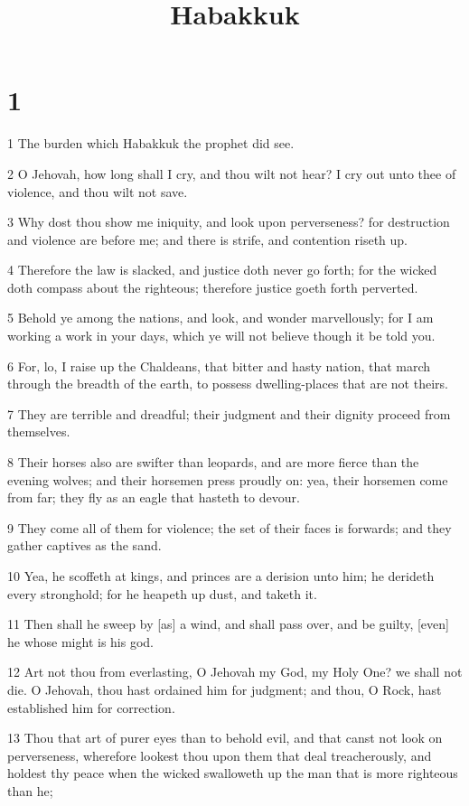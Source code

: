 

\title{Habakkuk}

\chapter{1}

\par 1 The burden which Habakkuk the prophet did see.
\par 2 O Jehovah, how long shall I cry, and thou wilt not hear? I cry out unto thee of violence, and thou wilt not save.
\par 3 Why dost thou show me iniquity, and look upon perverseness? for destruction and violence are before me; and there is strife, and contention riseth up.
\par 4 Therefore the law is slacked, and justice doth never go forth; for the wicked doth compass about the righteous; therefore justice goeth forth perverted.
\par 5 Behold ye among the nations, and look, and wonder marvellously; for I am working a work in your days, which ye will not believe though it be told you.
\par 6 For, lo, I raise up the Chaldeans, that bitter and hasty nation, that march through the breadth of the earth, to possess dwelling-places that are not theirs.
\par 7 They are terrible and dreadful; their judgment and their dignity proceed from themselves.
\par 8 Their horses also are swifter than leopards, and are more fierce than the evening wolves; and their horsemen press proudly on: yea, their horsemen come from far; they fly as an eagle that hasteth to devour.
\par 9 They come all of them for violence; the set of their faces is forwards; and they gather captives as the sand.
\par 10 Yea, he scoffeth at kings, and princes are a derision unto him; he derideth every stronghold; for he heapeth up dust, and taketh it.
\par 11 Then shall he sweep by [as] a wind, and shall pass over, and be guilty, [even] he whose might is his god.
\par 12 Art not thou from everlasting, O Jehovah my God, my Holy One? we shall not die. O Jehovah, thou hast ordained him for judgment; and thou, O Rock, hast established him for correction.
\par 13 Thou that art of purer eyes than to behold evil, and that canst not look on perverseness, wherefore lookest thou upon them that deal treacherously, and holdest thy peace when the wicked swalloweth up the man that is more righteous than he;
